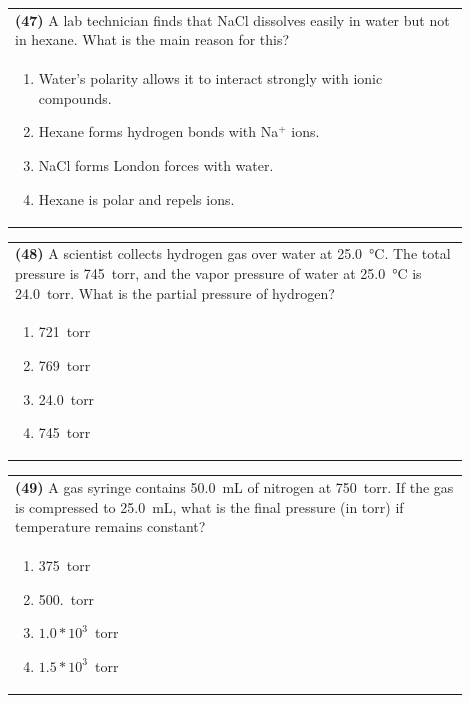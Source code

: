 \documentclass{article}
\begin{document}
\vspace{0.2cm}
\noindent\begin{tabular}{|p{0.9\linewidth}|}
\hline
\textbf{(47)} A lab technician finds that NaCl dissolves easily in water but not in hexane. What is the main reason for this?\\[0.2cm]
\begin{minipage}[t]{0.85\linewidth}
\begin{enumerate}[label=\alph*.]
\item Water's polarity allows it to interact strongly with ionic compounds.
\item Hexane forms hydrogen bonds with Na$^+$ ions.
\item NaCl forms London forces with water.
\item Hexane is polar and repels ions.
\end{enumerate}
\end{minipage}\\[0.2cm]
\hline
\end{tabular}

\vspace{0.2cm}
\noindent\begin{tabular}{|p{0.9\linewidth}|}
\hline
\textbf{(48)} A scientist collects hydrogen gas over water at 25.0~°C. The total pressure is 745~torr, and the vapor pressure of water at 25.0~°C is 24.0~torr. What is the partial pressure of hydrogen?\\[0.2cm]
\begin{minipage}[t]{0.85\linewidth}
\begin{enumerate}[label=\alph*.]
\item 721~torr
\item 769~torr
\item 24.0~torr
\item 745~torr
\end{enumerate}
\end{minipage}\\[0.2cm]
\hline
\end{tabular}
\newpage

\vspace{0.2cm}
\noindent\begin{tabular}{|p{0.9\linewidth}|}
\hline
\textbf{(49)} A gas syringe contains 50.0~mL of nitrogen at 750~torr. If the gas is compressed to 25.0~mL, what is the final pressure (in torr) if temperature remains constant?\\[0.2cm]
\begin{minipage}[t]{0.85\linewidth}
\begin{enumerate}[label=\alph*.]
\item 375~torr
\item 500.~torr
\item $1.0*10^3$~torr
\item $1.5*10^3$~torr
\end{enumerate}
\end{minipage}\\[0.2cm]
\hline
\end{tabular}
\end{document}
